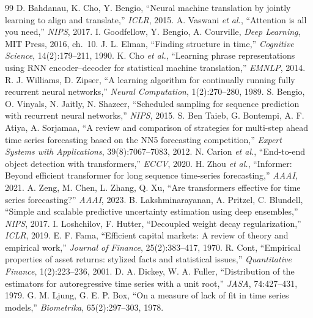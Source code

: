 \documentclass[11pt,a4paper]{article}
\begin{document}
\begin{thebibliography}{99}\small
{} D. Bahdanau, K. Cho, Y. Bengio, ``Neural machine translation by jointly learning to align and translate,'' \emph{ICLR}, 2015.
 A. Vaswani \emph{et al.}, ``Attention is all you need,'' \emph{NIPS}, 2017.
 I. Goodfellow, Y. Bengio, A. Courville, \emph{Deep Learning}, MIT Press, 2016, ch.~10.
 J. L. Elman, ``Finding structure in time,'' \emph{Cognitive Science}, 14(2):179--211, 1990.
 K. Cho \emph{et al.}, ``Learning phrase representations using RNN encoder--decoder for statistical machine translation,'' \emph{EMNLP}, 2014.
 R. J. Williams, D. Zipser, ``A learning algorithm for continually running fully recurrent neural networks,'' \emph{Neural Computation}, 1(2):270--280, 1989.
 S. Bengio, O. Vinyals, N. Jaitly, N. Shazeer, ``Scheduled sampling for sequence prediction with recurrent neural networks,'' \emph{NIPS}, 2015.
 S. Ben Taieb, G. Bontempi, A. F. Atiya, A. Sorjamaa, ``A review and comparison of strategies for multi-step ahead time series forecasting based on the NN5 forecasting competition,'' \emph{Expert Systems with Applications}, 39(8):7067--7083, 2012.
 N. Carion \emph{et al.}, ``End-to-end object detection with transformers,'' \emph{ECCV}, 2020.
 H. Zhou \emph{et al.}, ``Informer: Beyond efficient transformer for long sequence time-series forecasting,'' \emph{AAAI}, 2021.
 A. Zeng, M. Chen, L. Zhang, Q. Xu, ``Are transformers effective for time series forecasting?'' \emph{AAAI}, 2023.
 B. Lakshminarayanan, A. Pritzel, C. Blundell, ``Simple and scalable predictive uncertainty estimation using deep ensembles,'' \emph{NIPS}, 2017.
 I. Loshchilov, F. Hutter, ``Decoupled weight decay regularization,'' \emph{ICLR}, 2019.
 E. F. Fama, ``Efficient capital markets: A review of theory and empirical work,'' \emph{Journal of Finance}, 25(2):383--417, 1970.
 R. Cont, ``Empirical properties of asset returns: stylized facts and statistical issues,'' \emph{Quantitative Finance}, 1(2):223--236, 2001.
 D. A. Dickey, W. A. Fuller, ``Distribution of the estimators for autoregressive time series with a unit root,'' \emph{JASA}, 74:427--431, 1979.
 G. M. Ljung, G. E. P. Box, ``On a measure of lack of fit in time series models,'' \emph{Biometrika}, 65(2):297--303, 1978.

\end{thebibliography}
\end{document}
